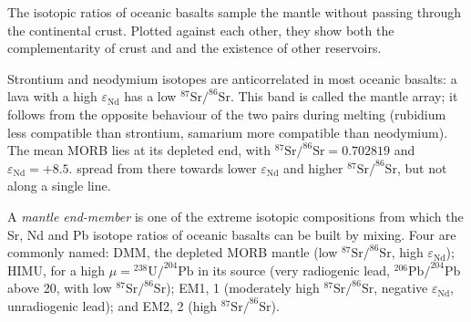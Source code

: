 The isotopic ratios of oceanic basalts sample the mantle without passing through
the continental crust. Plotted against each other, they show both the
complementarity of crust and  and the existence of other
reservoirs.

Strontium and neodymium isotopes are anticorrelated in most oceanic basalts: a
lava with a high $\varepsilon_{\mathrm{Nd}}$ has a low
$^{87}\mathrm{Sr}/^{86}\mathrm{Sr}$. This band is called the mantle array; it follows
from the opposite behaviour of the two pairs during melting (rubidium less
compatible than strontium, samarium more compatible than neodymium). The mean
MORB lies at its depleted end, with $^{87}\mathrm{Sr}/^{86}\mathrm{Sr} = 0.702819$ and
$\varepsilon_{\mathrm{Nd}} = +8.5$.  spread from there towards
lower $\varepsilon_{\mathrm{Nd}}$ and higher $^{87}\mathrm{Sr}/^{86}\mathrm{Sr}$, but not
along a single line.

\begin{definition}\label{def:b2:isotope-geochemistry:end-members}
A \emph{mantle end-member} is one of the extreme
isotopic compositions from which the Sr, Nd and Pb isotope ratios of oceanic
basalts can be built by mixing. Four are commonly named: DMM, the depleted
MORB mantle (low $^{87}\mathrm{Sr}/^{86}\mathrm{Sr}$, high $\varepsilon_{\mathrm{Nd}}$);
HIMU, for a high $\mu = {}^{238}\mathrm{U}/^{204}\mathrm{Pb}$ in its source
(very radiogenic lead, $^{206}\mathrm{Pb}/^{204}\mathrm{Pb}$ above 20, with low
$^{87}\mathrm{Sr}/^{86}\mathrm{Sr}$); EM1,  1 (moderately high
$^{87}\mathrm{Sr}/^{86}\mathrm{Sr}$, negative $\varepsilon_{\mathrm{Nd}}$, unradiogenic
lead); and EM2,  2 (high $^{87}\mathrm{Sr}/^{86}\mathrm{Sr}$).
\end{definition}

